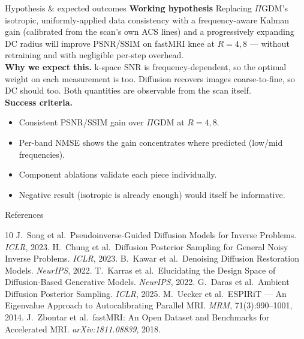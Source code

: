 \documentclass[aspectratio=169]{beamer}
\newcommand{\PIGDM}{$\Pi$GDM}
\begin{document}
\begin{frame}{Hypothesis \& expected outcomes}
  \textbf{Working hypothesis}
    Replacing \PIGDM{}'s isotropic, uniformly-applied data consistency with a \alert{frequency-aware Kalman gain} (calibrated from the scan's own ACS lines) and a \alert{progressively expanding DC radius} will improve PSNR/SSIM on fastMRI knee at $R\!=\!4,8$ --- without retraining and with negligible per-step overhead.\\ 
  \vspace{0.3em}
  \textbf{Why we expect this.} k-space SNR is frequency-dependent, so the optimal weight on each measurement is too. Diffusion recovers images coarse-to-fine, so DC should too. Both quantities are observable from the scan itself.\\
  \vspace{0.3em}
  \textbf{Success criteria.}
  \begin{itemize}
    \item Consistent PSNR/SSIM gain over \PIGDM{} at $R{=}4,8$.
    \item Per-band NMSE shows the gain concentrates where predicted (low/mid frequencies).
    \item Component ablations validate each piece individually.
    \item Negative result (isotropic is already enough) would itself be informative.
  \end{itemize}
\end{frame}

\begin{frame}{References}
  \footnotesize
  \begin{thebibliography}{10}
      J.~Song et al.\ Pseudoinverse-Guided Diffusion Models for Inverse Problems. \emph{ICLR}, 2023.
      H.~Chung et al.\ Diffusion Posterior Sampling for General Noisy Inverse Problems. \emph{ICLR}, 2023.
      B.~Kawar et al.\ Denoising Diffusion Restoration Models. \emph{NeurIPS}, 2022.
      T.~Karras et al.\ Elucidating the Design Space of Diffusion-Based Generative Models. \emph{NeurIPS}, 2022.
      G.~Daras et al.\ Ambient Diffusion Posterior Sampling. \emph{ICLR}, 2025.
      M.~Uecker et al.\ ESPIRiT --- An Eigenvalue Approach to Autocalibrating Parallel MRI. \emph{MRM}, 71(3):990--1001, 2014.
      J.~Zbontar et al.\ fastMRI: An Open Dataset and Benchmarks for Accelerated MRI. \emph{arXiv:1811.08839}, 2018.
  \end{thebibliography}
\end{frame}
\end{document}
